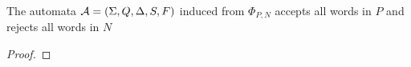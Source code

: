 \begin{theorem}
  The automata \(\mathcal{A} = \left(\Sigma, Q, \Delta, S, F\right)\)
  induced from \(\Phi_{P, N}\)
  accepts all words in \(P\) and rejects all words in \(N\)
\end{theorem}
\begin{proof}
\end{proof}









